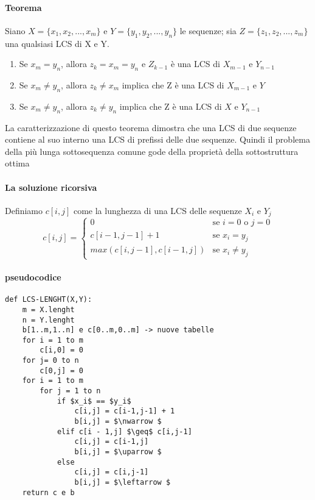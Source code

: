 \paragraph{Teorema}
Siano $X=\{x_1,x_2,...,x_m\}$ e $Y=\{y_1,y_2,...,y_n\}$ le sequenze; sia $Z=\{z_1,z_2,...,z_m\}$ una qualsiasi LCS di X e Y.
\begin{enumerate}
	\item Se $x_m = y_n$, allora $z_k = x_m =y_n$ e $Z_{k-1}$ è  una LCS di $X_{m-1}$ e $Y_{n-1}$
	\item Se $x_m \neq y_n$, allora $z_k \neq x_m$ implica che Z è una LCS di $X_{m-1}$ e $Y$
	\item Se $x_m \neq y_n$, allora $z_k \neq y_n$ implica che Z è una LCS di $X$ e $Y_{n-1}$
\end{enumerate}
La caratterizzazione di questo teorema dimostra che una LCS di due sequenze contiene al suo interno una LCS di prefissi delle due sequenze.
Quindi il problema della più lunga sottosequenza comune gode della proprietà della sottostruttura ottima

\paragraph{La soluzione ricorsiva}
Definiamo $c[i,j]$ come la lunghezza di una LCS delle sequenze $X_i$ e $Y_j$
\begin{equation*}
	c[i,j] = \begin{cases}
		0                       & \text{se $i = 0$ o $j = 0$} \\
		c[i-1,j-1] + 1          & \text{se $x_i = y_j$}       \\
		max(c[i,j-1], c[i-1,j]) & \text{se $x_i \neq y_j$}
	\end{cases}
\end{equation*}

\paragraph{pseudocodice}
\begin{lstlisting}
def LCS-LENGHT(X,Y):
	m = X.lenght
	n = Y.lenght
	b[1..m,1..n] e c[0..m,0..m] -> nuove tabelle
	for i = 1 to m
		c[i,0] = 0
	for j= 0 to n
		c[0,j] = 0
	for i = 1 to m
		for j = 1 to n
			if $x_i$ == $y_i$
				c[i,j] = c[i-1,j-1] + 1  
				b[i,j] = $\nwarrow $
			elif c[i - 1,j] $\geq$ c[i,j-1]
				c[i,j] = c[i-1,j]  
				b[i,j] = $\uparrow $
			else
				c[i,j] = c[i,j-1]  
				b[i,j] = $\leftarrow $
	return c e b
\end{lstlisting}



